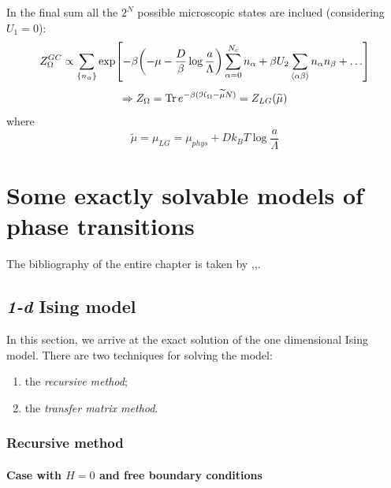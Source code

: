 \documentclass[../main/main.tex]{subfiles}
\begin{document}
\begin{remark}
In the final sum all the \( 2^N \) possible microscopic states are inclued (considering \( U_1 =0 \)):
\begin{equation}
  Z_ \Omega ^{GC} \propto  \sum_{\{ n_ \alpha  \}} \exp [-\beta \qty(-\mu - \frac{D}{\beta } \log{\frac{a}{\Lambda }} ) \sum_{\alpha =0}^{N_c} n_ \alpha  + \beta U_2 \sum_{\expval{\alpha \beta } }^{} n_ \alpha n_ \beta + \dots     ]
\end{equation}
\begin{equation}
  \Rightarrow Z_ \Omega = \Tr e^{-\beta ( \mathcal{H}_ \Omega - \widetilde{\mu} N )} = Z_{LG} ( \widetilde{\mu } )
\end{equation}
where
\begin{equation}
  \widetilde{\mu } = \mu _{LG} = \mu _{phys} + D k_B T \log{\frac{a}{\Lambda }}
\end{equation}
\end{remark}




\chapter{Some exactly solvable models of phase transitions}

The bibliography of the entire chapter is taken by \cite{9_lesson_1},\cite{9_lesson_2},\cite{9_lesson_3}.


\section{\emph{1-d} Ising model}
In this section, we arrive at the exact solution of the one dimensional Ising model.
 There are two techniques for solving the model:
\begin{enumerate}
\item the \emph{recursive method};
\item the \emph{transfer matrix method}.
\end{enumerate}

\subsection{Recursive method}

\subsubsection{Case with \( H=0 \) and free boundary conditions}
\end{document}
